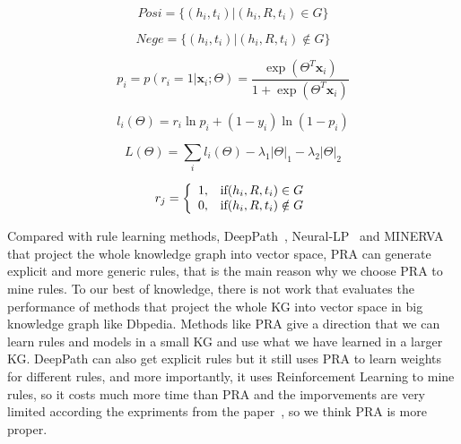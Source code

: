 \documentclass[runningheads]{llncs}
\begin{document}
\begin{equation}\label{posi}
    Posi = \{(h_i,t_i)|(h_i,R,t_i) \in G\}
\end{equation}

\begin{equation}\label{nege}
    Nege = \{(h_i,t_i)|(h_i,R,t_i) \notin G\}
\end{equation}

\begin{equation}
  p_i = p(r_i = 1|\mathbf x_i; \Theta) = \frac{\exp(\Theta^T \mathbf x_i) } { 1 + \exp (\Theta^T \mathbf x_i)}
\end{equation}

\begin{equation}
    l_{i} (\Theta) = r_{i}\ln p_{i} + (1 - y_{i}) \ln ( 1 - p_{i})
\end{equation}

\begin{equation}\label{loss}
    L(\Theta) = \sum_{i} l_{i} (\Theta) - \lambda_{1}|\Theta|_{1}-\lambda_{2}|\Theta|_{2}
\end{equation}

\begin{equation}\label{rj}
r_{j} =
\left\{
\begin{array}{ l l }
  1, & { \text{if} (h_i,R,t_i) \in G } \\
  0, & { \text{if} (h_i,R,t_i) \notin G }
\end{array}
\right.
\end{equation}

Compared with rule learning methods, DeepPath~\cite{xiong2017deeppath}, Neural-LP~\cite{yang2017differentiable} and MINERVA~\cite{das2017go} that project the whole knowledge graph into vector space, PRA can generate explicit and more generic rules, that is the main reason why we choose PRA to mine rules. To our best of knowledge, there is not work that evaluates the performance of methods that project the whole KG into vector space in big knowledge graph like Dbpedia. Methods like PRA give a direction that we can learn rules and models in a small KG and use what we have learned in a larger KG. DeepPath can also get explicit rules but it still uses PRA to learn weights for different rules, and more importantly, it uses Reinforcement Learning to mine rules, so it costs much more time than PRA and the imporvements are very limited according the expriments from the paper~\cite{xiong2017deeppath}, so we think PRA is more proper.
\end{document}
